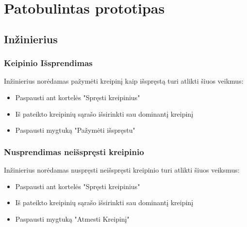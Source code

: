 
\section{Patobulintas prototipas}

\subsection{Inžinierius}
	
	
	

	\subsubsection{Keipinio Išsprendimas}
	
	Inžinierius norėdamas pažymėti kreipinį kaip išspręstą turi atlikti šiuos veikmus:
	
	\begin{itemize}
		\item Paspausti ant kortelės "Spręsti kreipinius" 
		\item Iš pateikto kreipinių sąrašo išsirinkti sau dominantį kreipinį 
		\item Paspausti mygtuką "Pažymėti išspręstu" 
	\end{itemize}
	
	\subsubsection{Nusprendimas neišspręsti kreipinio}
	
	Inžinierius norėdamas nuspręsti neišspręsti kreipinio turi atlikti šiuos veiksmus:
	
	\begin{itemize}
		\item Paspausti ant kortelės "Spręsti kreipinius" 
		\item Iš pateikto kreipinių sąrašo išsirinkti sau dominantį kreipinį 
		\item Paspausti mygtuką "Atmesti Kreipinį" 
	\end{itemize}
	
